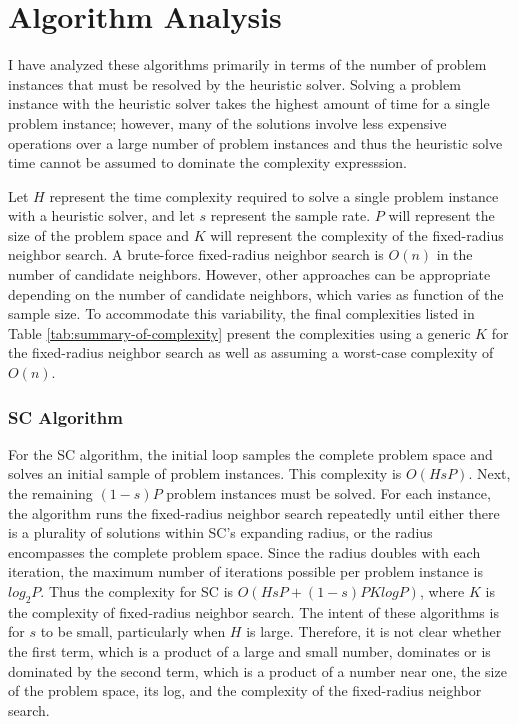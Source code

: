 \section{Algorithm Analysis}

I have analyzed these algorithms primarily in terms of the number of problem instances that must be resolved by the heuristic solver.  Solving a problem instance with the heuristic solver takes the highest amount of time for a single problem instance; however, many of the solutions involve less expensive operations over a large number of problem instances and thus the heuristic solve time cannot be assumed to dominate the complexity expresssion.  

Let $H$ represent the time complexity required to solve a single problem instance with a heuristic solver, and let $s$ represent the sample rate.  $P$ will represent the size of the problem space and $K$ will represent the complexity of the fixed-radius neighbor search.  A brute-force fixed-radius neighbor search is $O(n)$ in the number of candidate neighbors.  However, other approaches can be appropriate depending on the number of candidate neighbors, which varies as function of the sample size.  To accommodate this variability, the final complexities listed in Table \ref{tab:summary-of-complexity} present the complexities using a generic $K$ for the fixed-radius neighbor search as well as assuming a worst-case complexity of  $O(n)$.

\subsubsection{SC Algorithm}For the SC algorithm, the initial loop samples the complete problem space and solves an initial sample of problem instances.  This complexity is $O(HsP)$.  Next, the remaining $(1-s)P$ problem instances must be solved.  For each instance, the algorithm runs the fixed-radius neighbor search repeatedly until either there is a plurality of solutions within SC's expanding radius, or the radius encompasses the complete problem space.  Since the radius doubles with each iteration, the maximum number of iterations possible per problem instance is $log_2P$.  Thus the complexity for SC is $O(HsP + (1-s)PKlogP)$, where $K$ is the complexity of fixed-radius neighbor search.  The intent of these algorithms is for $s$ to be small, particularly when $H$ is large.  Therefore, it is not clear whether the first term, which is a product of a large and small number, dominates or is dominated by the second term, which is a product of a number near one, the size of the problem space, its log, and the complexity of the fixed-radius neighbor search.

